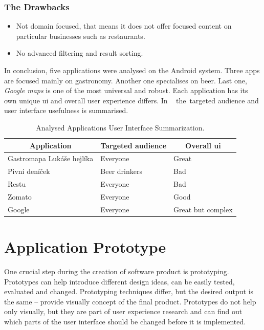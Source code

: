 \subsubsection{The Drawbacks}
\begin{itemize}
    \item Not domain focused, that means it does not offer focused content on particular businesses such as restaurants.
    \item No advanced filtering and result sorting.
\end{itemize}

In conclusion, five applications were analysed on the Android system. Three apps are focused mainly on gastronomy. Another one specialises on beer. Last one, \textit{Google maps} is one of the most universal and robust. 
Each application has its own unique \gls{ui} and overall user experience differs. In ~ the~targeted audience and user interface usefulness is summarised.

\begin{table}[htbp]
\centering
\begin{tabular}{|l|l|l|}
\hline
\multicolumn{1}{|c|}{Application} & \multicolumn{1}{c|}{Targeted audience} & \multicolumn{1}{c|}{Overall \gls{ui}} \\ \hline
Gastromapa Lukáše hejlíka         & Everyone                               & Great                           \\ \hline
Pivní deníček                       & Beer drinkers                          & Bad                            \\ \hline
Restu                             & Everyone                               & Bad                            \\ \hline
Zomato                            & Everyone                               & Good                            \\ \hline
Google                            & Everyone                               & Great but complex              \\ \hline
\end{tabular}
\caption{Analysed Applications User Interface Summarization.}
\label{table:app-analysis}
\end{table}

\section{Application Prototype}
One crucial step during the creation of software product is prototyping. Prototypes can help introduce different design ideas, can be easily tested, evaluated and changed. Prototyping techniques differ, but the desired output is the same -- provide visually concept of the final product. Prototypes do not help only visually, but they are part of user experience research and can find out which parts of the user interface should be changed before it is implemented.

